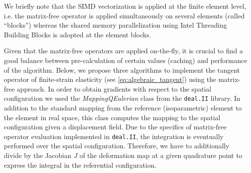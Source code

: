 \documentclass[times,doublespace]{nmeauth}
\begin{document}
We briefly note that the SIMD vectorization is applied at the finite element level, {\color{red}i.e.} the {\color{red}matrix-free} operator is applied simultaneously on several elements (called ``blocks'') whereas the shared memory parallelization using Intel Threading Building Blocks is adopted at the element blocks.

Given that the matrix-free operators are applied on-the-fly, it is crucial to find a good balance between pre-calculation of certain values (caching) and performance of the algorithm.
Below, we propose three algorithms to implement the tangent {\color{red}operator} of finite-strain elasticity (see \eqref{eq:algebraic_tangent}) using the matrix-free approach.
%
In order to obtain gradients with respect to the {\color{red}spatial} configuration we used the \textit{MappingQEulerian} class from the \texttt{deal.II} \cite{dealII90} library.
In addition to the standard mapping from the reference (isoparametric) element to the element in real space, this class computes the mapping to the {\color{red}spatial} configuration given a displacement field.
%
Due to the specifics of matrix-free operator evaluation implemented in \texttt{deal.II}, the integration is {\color{red}eventually} performed over the {\color{red}spatial} configuration.
Therefore, we have to {\color{red}additionally} divide by the Jacobian $J$ of the deformation map at a given quadrature point to express the integral in the {\color{red}referential} configuration.
\end{document}
